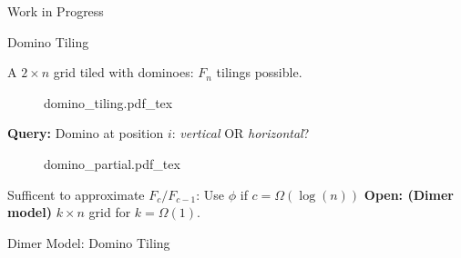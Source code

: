 \begin{block}{Work in Progress}

\begin{alertblock}{Domino Tiling}

A $2\times n$ grid tiled with dominoes: $F_n$ tilings possible.
\begin{figure}[h!]\centering
    \def\svgwidth{0.7\columnwidth}
    {domino_tiling.pdf_tex}
\end{figure}
\textbf{Query:} Domino at position $i$: \emph{vertical} OR \emph{horizontal}?
\begin{figure}[h!]\centering
    \def\svgwidth{0.7\columnwidth}
    {domino_partial.pdf_tex}
\end{figure}
Sufficent to approximate $F_c/F_{c-1}$: Use $\phi$ if $c = \Omega(\log(n))$
\textbf{Open: (Dimer model)} $k\times n$ grid for $k = \Omega(1)$.

\end{alertblock}

\begin{alertblock}{Dimer Model: Domino Tiling}
\end{alertblock}

\end{block}
